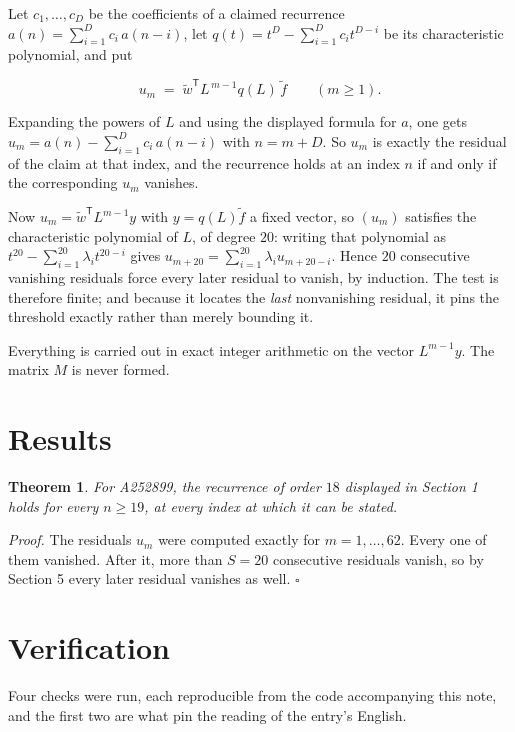 \documentclass[11pt]{article}
\newtheorem{theorem}{Theorem}
\theoremstyle{definition}
\begin{document}
Let $c_1,\dots,c_D$ be the coefficients of a claimed recurrence $a(n) = \sum_{i=1}^{D} c_i\,a(n-i)$, let $q(t) = t^{D} - \sum_{i=1}^{D} c_i t^{D-i}$ be its characteristic polynomial, and put

\[u_m \;=\; \tilde w^{\mathsf T} L^{\,m-1} q(L)\,\tilde f \qquad (m \ge 1).\]

Expanding the powers of $L$ and using the displayed formula for $a$, one gets $u_m = a(n) - \sum_{i=1}^{D} c_i\,a(n-i)$ with $n = m + D$. So $u_m$ is exactly the residual of the claim at that index, and the recurrence holds at an index $n$ if and only if the corresponding $u_m$ vanishes.

Now $u_m = \tilde w^{\mathsf T} L^{m-1} y$ with $y = q(L)\tilde f$ a fixed vector, so $(u_m)$ satisfies the characteristic polynomial of $L$, of degree $20$: writing that polynomial as $t^{20} - \sum_{i=1}^{20} \lambda_i t^{20-i}$ gives $u_{m+20} = \sum_{i=1}^{20} \lambda_i u_{m+20-i}$. Hence $20$ consecutive vanishing residuals force every later residual to vanish, by induction. The test is therefore finite; and because it locates the {\itshape last} nonvanishing residual, it pins the threshold exactly rather than merely bounding it.

Everything is carried out in exact integer arithmetic on the vector $L^{m-1}y$. The matrix $M$ is never formed.

\section{Results}

\begin{theorem} For A252899, the recurrence of order $18$ displayed in Section 1 holds for every $n \ge 19$, at every index at which it can be stated.\end{theorem}

{\itshape Proof.} The residuals $u_m$ were computed exactly for $m = 1,\dots,62$. Every one of them vanished. After it, more than $S = 20$ consecutive residuals vanish, so by Section 5 every later residual vanishes as well. $\square$

\section{Verification}

Four checks were run, each reproducible from the code accompanying this note, and the first two are what pin the reading of the entry's English.
\end{document}
